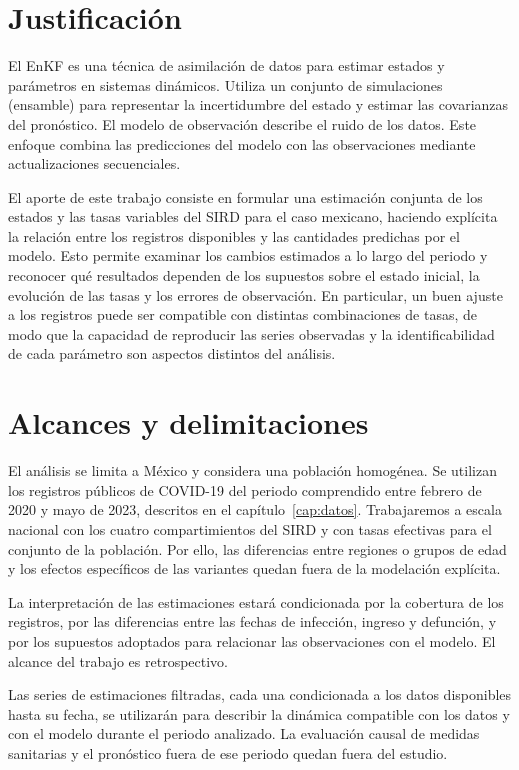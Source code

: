 \section{Justificación}


El EnKF es una técnica de asimilación de datos para estimar estados y parámetros en sistemas dinámicos. Utiliza un conjunto de simulaciones (ensamble) para representar la incertidumbre del estado y estimar las covarianzas del pronóstico. El modelo de observación describe el ruido de los datos. Este enfoque combina las predicciones del modelo con las observaciones mediante actualizaciones secuenciales.

El aporte de este trabajo consiste en formular una estimación conjunta de los estados y las tasas variables del SIRD para el caso mexicano, haciendo explícita la relación entre los registros disponibles y las cantidades predichas por el modelo. Esto permite examinar los cambios estimados a lo largo del periodo y reconocer qué resultados dependen de los supuestos sobre el estado inicial, la evolución de las tasas y los errores de observación. En particular, un buen ajuste a los registros puede ser compatible con distintas combinaciones de tasas, de modo que la capacidad de reproducir las series observadas y la identificabilidad de cada parámetro son aspectos distintos del análisis.


\section{Alcances y delimitaciones}


El análisis se limita a México y considera una población homogénea. Se utilizan los registros públicos de COVID-19 del periodo comprendido entre febrero de 2020 y mayo de 2023, descritos en el capítulo~\ref{cap:datos}. Trabajaremos a escala nacional con los cuatro compartimientos del SIRD y con tasas efectivas para el conjunto de la población. Por ello, las diferencias entre regiones o grupos de edad y los efectos específicos de las variantes quedan fuera de la modelación explícita.

La interpretación de las estimaciones estará condicionada por la cobertura de los registros, por las diferencias entre las fechas de infección, ingreso y defunción, y por los supuestos adoptados para relacionar las observaciones con el modelo. El alcance del trabajo es retrospectivo.

Las series de estimaciones filtradas, cada una condicionada a los datos disponibles hasta su fecha, se utilizarán para describir la dinámica compatible con los datos y con el modelo durante el periodo analizado. La evaluación causal de medidas sanitarias y el pronóstico fuera de ese periodo quedan fuera del estudio.

